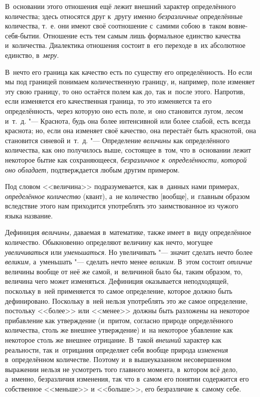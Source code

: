 В~основании этого отношения ещё лежит внешний характер определённого
количества; здесь относятся друг к~другу именно {\em безразличные}
определённые количества, т.~е. они имеют своё соотношение
с~самими собою в~таком вовне-себя-бытии.
Отношение есть тем самым лишь формальное единство качества
и~количества. Диалектика отношения состоит в~его переходе в~их абсолютное
единство, в~{\em меру}.

\subremark{}

В~нечто его граница как качество есть по существу его определённость. Но если
мы под границей понимаем количественную границу, и, например, поле изменяет эту
свою границу, то оно остаётся полем как до, так и~после этого. Напротив, если
изменяется его качественная граница, то это изменяется та его определённость,
через которую оно есть поле, и~оно становится лугом, лесом и~т.~д. "---
Краснота, будь она более интенсивной или более слабой, есть всегда краснота;
но, если она изменяет своё качество, она перестаёт быть краснотой, она
становится синевой и~т.~д. "--- Определение {\em величины} как определённого
количества, как оно получилось выше, состоящее в~том, что в~основании лежит
некоторое бытие как сохраняющееся, {\em безразличное к~определённости, которой
оно обладает,} подтверждается любым другим примером.

Под словом <<величина>> подразумевается, как в~данных нами примерах,
{\em определённое количество} (квант), а~не количество [вообще], и~главным
образом вследствие этого нам приходится употреблять это заимствованное из
чужого языка название.

Дефиниция {\em величины,} даваемая в~математике, также имеет в~виду
определённое количество. Обыкновенно определяют величину как нечто, могущее
{\em увеличиваться} или {\em уменьшаться}. Но увеличивать "--- значит сделать
нечто более {\em великим,} а~уменьшать "--- сделать нечто менее {\em великим}.
В~этом состоит {\em отличие} величины вообще от неё же самой, и~величиной было
бы, таким образом, то, величина чего может изменяться. Дефиниция оказывается
неподходящей, поскольку в~ней применяется то самое определение, которое должно
быть дефинировано. Поскольку в~ней нельзя употреблять это же самое определение,
постольку <<более>> или <<менее>> должны быть разложены на некоторое
прибавление как утверждение (и~притом, согласно природе определённого
количества, столь же внешнее утверждение) и~на некоторое убавление как
некоторое столь же внешнее отрицание. В~такой {\em внешний} характер как
реальности, так и~отрицания определяет себя вообще природа {\em изменения}
в~определённом количестве. Поэтому и~в вышеуказанном несовершенном выражении
нельзя не усмотреть того главного момента, в~котором всё дело, а~именно,
безразличия изменения, так что в~самом его понятии содержится его собственное
<<меньше>> и <<больше>>, его безразличие к~самому себе.

